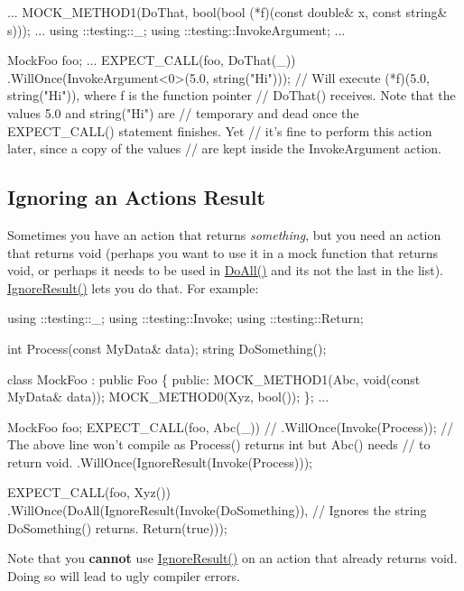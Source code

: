\begin{DoxyCode}
...
  MOCK\_METHOD1(DoThat, bool(bool (*f)(const double& x, const string& s)));
...
using ::testing::\_;
using ::testing::InvokeArgument;
...

  MockFoo foo;
  ...
  EXPECT\_CALL(foo, DoThat(\_))
      .WillOnce(InvokeArgument<0>(5.0, string("Hi")));
  // Will execute (*f)(5.0, string("Hi")), where f is the function pointer
  // DoThat() receives.  Note that the values 5.0 and string("Hi") are
  // temporary and dead once the EXPECT\_CALL() statement finishes.  Yet
  // it's fine to perform this action later, since a copy of the values
  // are kept inside the InvokeArgument action.
\end{DoxyCode}


\subsection*{Ignoring an Action\textquotesingle{}s Result}

Sometimes you have an action that returns {\itshape something}, but you need an action that returns {\ttfamily void} (perhaps you want to use it in a mock function that returns {\ttfamily void}, or perhaps it needs to be used in {\ttfamily \hyperlink{namespacetesting_a5f533932753d2af95000e96c4a3042e3}{Do\+All()}} and it\textquotesingle{}s not the last in the list). {\ttfamily \hyperlink{namespacetesting_a50ae42540a31047c7fddd32df8d835f5}{Ignore\+Result()}} lets you do that. For example\+:


\begin{DoxyCode}
using ::testing::\_;
using ::testing::Invoke;
using ::testing::Return;

int Process(const MyData& data);
string DoSomething();

class MockFoo : public Foo \{
 public:
  MOCK\_METHOD1(Abc, void(const MyData& data));
  MOCK\_METHOD0(Xyz, bool());
\};
...

  MockFoo foo;
  EXPECT\_CALL(foo, Abc(\_))
  // .WillOnce(Invoke(Process));
  // The above line won't compile as Process() returns int but Abc() needs
  // to return void.
      .WillOnce(IgnoreResult(Invoke(Process)));

  EXPECT\_CALL(foo, Xyz())
      .WillOnce(DoAll(IgnoreResult(Invoke(DoSomething)),
      // Ignores the string DoSomething() returns.
                      Return(true)));
\end{DoxyCode}


Note that you {\bfseries cannot} use {\ttfamily \hyperlink{namespacetesting_a50ae42540a31047c7fddd32df8d835f5}{Ignore\+Result()}} on an action that already returns {\ttfamily void}. Doing so will lead to ugly compiler errors.

